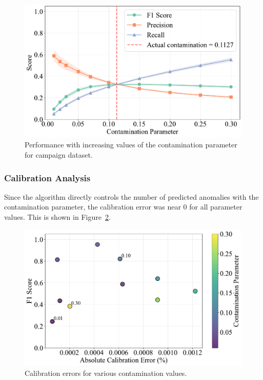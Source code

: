 \documentclass[10pt, conference]{IEEEtran}
\begin{document}
\begin{figure}[H]
	\centering
	\includegraphics[width=0.95\linewidth]{../results/campaign/contamination/performance_vs_contamination.pdf}
	\caption{Performance with increasing values of the contamination parameter for campaign dataset.}
	\label{fig:contamination_campaign}
\end{figure}


\subsubsection{Calibration Analysis}
Since the algorithm directly controls the number of predicted anomalies with the contamination parameter, the calibration error was near 0 for all parameter values. This is shown in Figure~\ref{fig:contamination_shuttle_calibration}.
\begin{figure}[H]
	\centering
	\includegraphics[width=0.95\linewidth]{../results/shuttle/contamination/f1_vs_calibration_error.pdf}
	\caption{Calibration errors for various contamination values.}
	\label{fig:contamination_shuttle_calibration}
\end{figure}
\end{document}
